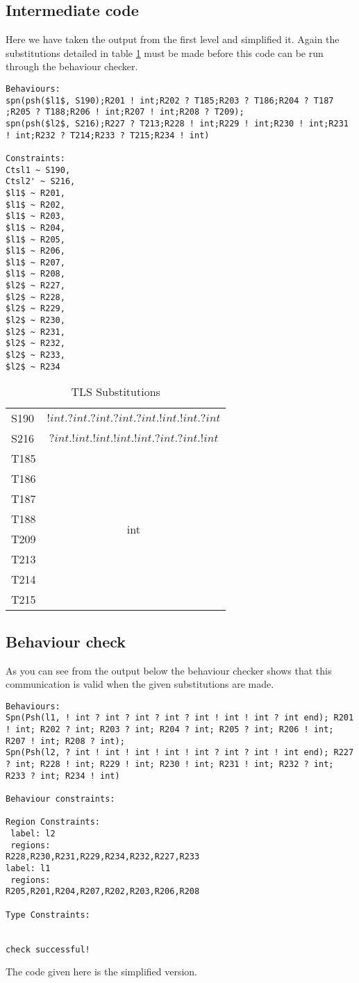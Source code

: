 \subsection{Intermediate code}
Here we have taken the output from the first level and simplified it. Again the substitutions detailed in table \ref{tLSSubs} must be made before this code can be run through the behaviour checker. 


\begin{lstlisting}
Behaviours:
spn(psh($l1$, S190);R201 ! int;R202 ? T185;R203 ? T186;R204 ? T187 ;R205 ? T188;R206 ! int;R207 ! int;R208 ? T209);
spn(psh($l2$, S216);R227 ? T213;R228 ! int;R229 ! int;R230 ! int;R231 ! int;R232 ? T214;R233 ? T215;R234 ! int)

Constraints:
Ctsl1 ~ S190,
Ctsl2' ~ S216,
$l1$ ~ R201,
$l1$ ~ R202,
$l1$ ~ R203,
$l1$ ~ R204,
$l1$ ~ R205,
$l1$ ~ R206,
$l1$ ~ R207,
$l1$ ~ R208,
$l2$ ~ R227,
$l2$ ~ R228,
$l2$ ~ R229,
$l2$ ~ R230,
$l2$ ~ R231,
$l2$ ~ R232,
$l2$ ~ R233,
$l2$ ~ R234
\end{lstlisting}

\begin{table}
\centering
\begin{tabular}{l | c}
S190 &  $!int.?int.?int.?int.?int.!int.!int.?int$  \\
S216 & $?int.!int.!int.!int.!int.?int.?int.!int$ \\ 
T185 & \multirow{8}{*}{int} \\
T186 & \\ 
T187 & \\
T188 & \\ 
T209 & \\ 
T213 & \\ 
T214 & \\ 
T215 & \\ 
\end{tabular}
\caption{TLS Substitutions}
\label{tLSSubs}
\end{table}


\subsection{Behaviour check}

As you can see from the output below the behaviour checker shows that this communication is valid when the given substitutions are made. 

\begin{lstlisting}
Behaviours:
Spn(Psh(l1, ! int ? int ? int ? int ? int ! int ! int ? int end); R201 ! int; R202 ? int; R203 ? int; R204 ? int; R205 ? int; R206 ! int; R207 ! int; R208 ? int); 
Spn(Psh(l2, ? int ! int ! int ! int ! int ? int ? int ! int end); R227 ? int; R228 ! int; R229 ! int; R230 ! int; R231 ! int; R232 ? int; R233 ? int; R234 ! int)

Behaviour constraints:

Region Constraints:
 label: l2
 regions:
R228,R230,R231,R229,R234,R232,R227,R233
label: l1
 regions:
R205,R201,R204,R207,R202,R203,R206,R208

Type Constraints:
 

check successful!

\end{lstlisting}

The code given here is the simplified version. 